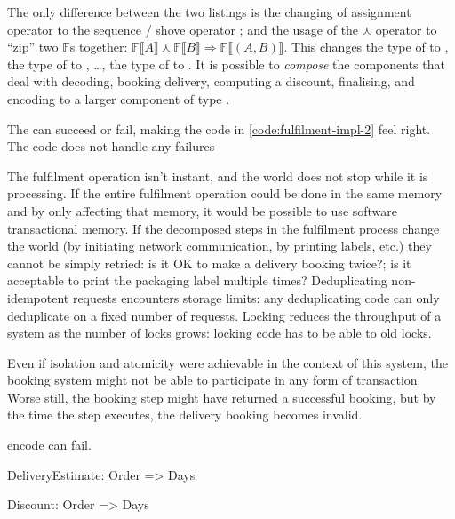The only difference between the two listings is the changing of assignment operator \pcode{=} to the sequence / shove operator \pcode{<-}; and the usage of the $\curlywedge$ operator to ``zip'' two $\mathds{F}$s together: $\mathds{F}\lBrack{}A\rBrack \curlywedge \mathds{F}\lBrack{}B\rBrack \Rightarrow \mathds{F}\lBrack(A, B)\rBrack$. This changes the type of  to , the type of  to , \ldots, the type of  to . It is possible to \emph{compose} the components that deal with decoding, booking delivery, computing a discount, finalising, and encoding to a larger component of type .


The  can succeed or fail, making the code in \autoref{code:fulfilment-impl-2} feel right. The code does not handle any failures

The fulfilment operation isn't instant, and the world does not stop while it is processing. If the entire fulfilment operation could be done in the same memory and by only affecting that memory, it would be possible to use software transactional memory\cite{stm}. If the decomposed steps in the fulfilment process change the world (by initiating network communication, by printing labels, etc.) they cannot be simply retried: is it OK to make a delivery booking twice?; is it acceptable to print the packaging label multiple times? Deduplicating non-idempotent requests encounters storage limits: any deduplicating code can only deduplicate on a fixed number of requests. Locking reduces the throughput of a system as the number of locks grows: locking code has to be able to old locks. 

Even if isolation and atomicity were achievable in the context of this system, the  booking system might not be able to participate in any form of transaction. Worse still, the  booking step might have returned a successful booking, but by the time the  step executes, the delivery booking becomes invalid.

encode can fail.

DeliveryEstimate: Order => Days

Discount: Order => Days

